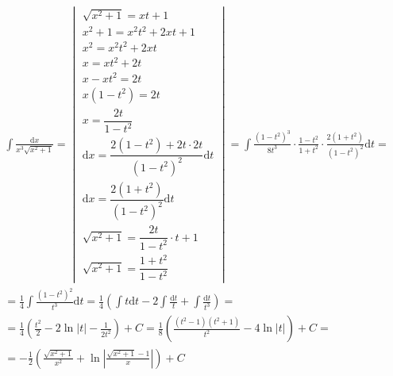 \begin{gather*}
\int{\frac{\mbox{d}x}{x^3\sqrt{x^2+1}}} =
\begin{vmatrix}
  \sqrt{x^2+1}=xt+1\\
  x^2+1=x^2t^2+2xt+1\\
  x^2=x^2t^2+2xt\\
  x=xt^2+2t\\
  x-xt^2=2t\\
  x(1-t^2)=2t\\
  x=\dfrac{2t}{1-t^2}\\
  \mbox{d}x=\dfrac{2(1-t^2)+2t\cdot 2t}{(1-t^2)^2}\mbox{d}t\\
  \mbox{d}x=\dfrac{2(1+t^2)}{(1-t^2)^2}\mbox{d}t\\
  \sqrt{x^2+1} = \dfrac{2t}{1-t^2} \cdot t+1 \\
  \sqrt{x^2+1} = \dfrac{1+t^2}{1-t^2}
\end{vmatrix}
= \int{\frac{(1-t^2)^3}{8t^3}\cdot\frac{1-t^2}{1+t^2}\cdot\frac{2(1+t^2)}{(1-t^2)^2}\mbox{d}t} = \\
= \frac{1}{4}\int{\frac{(1-t^2)^2}{t^3}\mbox{d}t}
= \frac{1}{4}\left(\int{t\mbox{d}t}-2\int{\frac{\mbox{d}t}{t}}+\int{\frac{\mbox{d}t}{t^3}}\right) = \\
= \frac{1}{4}\left(\frac{t^2}{2}-2\ln{\left|t\right|}-\frac{1}{2t^2}\right)+C
= \frac{1}{8}\left(\frac{(t^2-1)(t^2+1)}{t^2}-4\ln{|t|}\right)+C = \\
= -\frac{1}{2}\left(\frac{\sqrt{x^2+1}}{x^2}+\ln{\left|\frac{\sqrt{x^2+1}-1}{x}\right|}\right)+C
\end{gather*}




